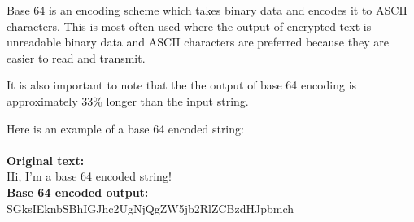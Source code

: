 Base 64 is an encoding scheme which takes binary data and encodes it to ASCII characters. This
is most often used where the output of encrypted text is unreadable binary data and ASCII
characters are preferred because they are easier to read and transmit. 

It is also important to note that the the output of base 64 encoding is approximately
33\% longer than the input string.

Here is an example of a base 64 encoded string:\\\\
\textbf{Original text:}\\
Hi, I'm a base 64 encoded string!\\
\textbf{Base 64 encoded output:}\\
SGksIEknbSBhIGJhc2UgNjQgZW5jb2RlZCBzdHJpbmch
